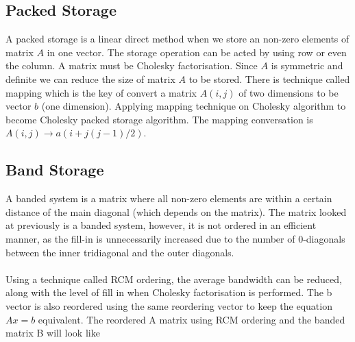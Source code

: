 \documentclass[12pt,a4paper]{article}
\begin{document}
\subsection{Packed Storage}
A packed storage is a linear direct method when we store an non-zero elements of matrix $A$ in one vector. The storage operation can be acted by using row or even the column. A matrix must be Cholesky factorisation. Since $A$ is symmetric and definite we can reduce the size of matrix $A$  to be stored. There is technique called mapping which is the key of convert a matrix $A(i,j)$ of two dimensions to be vector $b$ (one dimension). Applying mapping  technique on Cholesky algorithm to become Cholesky packed storage algorithm. The mapping conversation is $A(i,j) \to a(i+j(j-1)/2)$. 

\subsection{Band Storage}
A banded system is a matrix where all non-zero elements are within a certain distance of the main diagonal (which depends on the matrix). The matrix looked at previously is a banded system, however, it is not ordered in an efficient manner, as the fill-in is unnecessarily increased due to the number of 0-diagonals between the inner tridiagonal and the outer diagonals. \\\\Using a technique called RCM ordering, the average bandwidth can be reduced, along with the level of fill in when Cholesky factorisation is performed. The b vector is also reordered using the same reordering vector to keep the equation $Ax=b$ equivalent. The reordered A matrix using RCM ordering and the banded matrix B will look like
\end{document}
